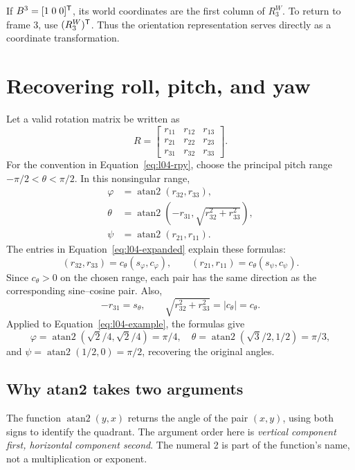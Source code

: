 If $B^3=[1\;0\;0]^{\mathsf T}$, its world coordinates are the first column of
$R_3^W$. To return to frame 3, use $(R_3^W)^{\mathsf T}$. Thus the orientation
representation serves directly as a coordinate transformation.

\section{Recovering roll, pitch, and yaw}
Let a valid rotation matrix be written as
\[
 R=\begin{bmatrix}r_{11}&r_{12}&r_{13}\\r_{21}&r_{22}&r_{23}\\r_{31}&r_{32}&r_{33}\end{bmatrix}.
\]
For the convention in Equation~\eqref{eq:l04-rpy}, choose the principal pitch
range $-\pi/2<\theta<\pi/2$. In this nonsingular range,
\begin{equation}
 \boxed{\begin{aligned}
 \varphi&=\operatorname{atan2}(r_{32},r_{33}),\\
 \theta&=\operatorname{atan2}\!\left(-r_{31},\sqrt{r_{32}^2+r_{33}^2}\right),\\
 \psi&=\operatorname{atan2}(r_{21},r_{11}).
 \end{aligned}}
 \label{eq:l04-extraction}
\end{equation}
The entries in Equation~\eqref{eq:l04-expanded} explain these formulas:
\[
 (r_{32},r_{33})=c_\theta(s_\varphi,c_\varphi),\qquad
 (r_{21},r_{11})=c_\theta(s_\psi,c_\psi).
\]
Since $c_\theta>0$ on the chosen range, each pair has the same direction as
the corresponding sine--cosine pair. Also,
\[
 -r_{31}=s_\theta,\qquad
 \sqrt{r_{32}^2+r_{33}^2}=|c_\theta|=c_\theta.
\]
Applied to Equation~\eqref{eq:l04-example}, the formulas give
\[
 \varphi=\operatorname{atan2}(\sqrt2/4,\sqrt2/4)=\pi/4,
 \quad \theta=\operatorname{atan2}(\sqrt3/2,1/2)=\pi/3,
\]
and $\psi=\operatorname{atan2}(1/2,0)=\pi/2$, recovering the original angles.

\subsection{Why atan2 takes two arguments}
The function $\operatorname{atan2}(y,x)$ returns the angle of the pair $(x,y)$,
using both signs to identify the quadrant. The argument order here is
\emph{vertical component first, horizontal component second}. The numeral 2
is part of the function's name, not a multiplication or exponent.

